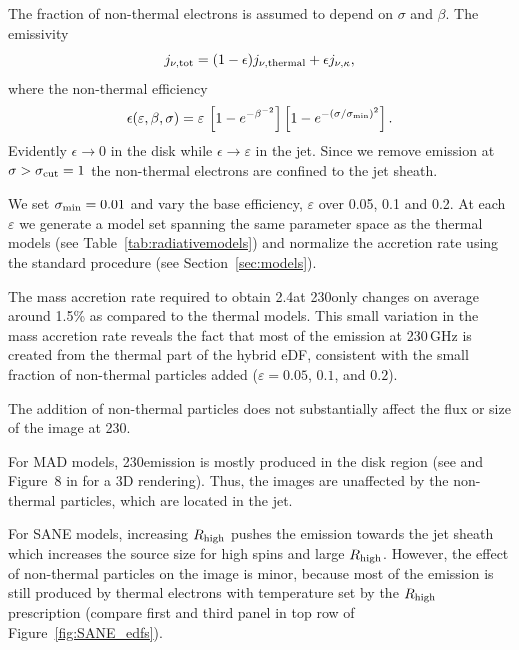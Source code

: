 The fraction of non-thermal electrons is assumed to depend on $\sigma$ and $\beta$.  The emissivity
\begin{equation}
  j_{\nu,\rm{tot}}=(1-\epsilon) j_{\nu,\rm{thermal}} + \epsilon j_{\nu, \kappa},
  \label{eq:kappaeff}
\end{equation}
where the non-thermal efficiency
\begin{equation}
  \epsilon(\varepsilon,\beta,\sigma)=\varepsilon\,
  \left[1 - e^{-\beta^{-2}}\right]
  \left[1-e^{-(\sigma/\sigma_{\rm min})^2}\right].
  \label{eq:efficiencybetasigma}
\end{equation}
Evidently $\epsilon \rightarrow 0$ in the disk while $\epsilon \rightarrow \varepsilon$ in the jet.
Since we remove emission at $\sigma > \sigma_{\rm cut} = 1$ the non-thermal electrons are confined to the jet sheath.

We set $\sigma_{\rm min}=0.01$ and vary the base efficiency, $\varepsilon$ over 0.05, 0.1 and 0.2.
At each $\varepsilon$ we generate a model set spanning the same parameter space as the thermal models (see Table~\ref{tab:radiativemodels}) and normalize the accretion rate using the standard procedure (see Section~\ref{sec:models}).

The mass accretion rate required to obtain 2.4\Jy at 230\GHz only changes on average around 1.5\% as compared to the thermal models.
This small variation in the mass accretion rate reveals the fact that most of the emission at 230\,GHz is created from the thermal part of the hybrid eDF, consistent with the small fraction of non-thermal particles added ($\varepsilon=0.05$, $0.1$, and $0.2$).

\label{varkappa230}

The addition of non-thermal particles does not substantially affect the flux or size of the image at 230\GHz.

For MAD models, 230\GHz emission is mostly produced in the disk region (see  and Figure~8 in \citealt{Wong_2022} for a 3D rendering).
Thus, the images are unaffected by the non-thermal particles, which are located in the jet.

For SANE models, increasing $R_\mathrm{high}$ pushes the emission towards the jet sheath which increases the source size for high spins and large $R_\mathrm{high}$.
However, the effect of non-thermal particles on the image is minor, because most of the emission is still produced by thermal electrons with temperature set by the $R_\mathrm{high}$ prescription (compare first and third panel in top row of Figure~\ref{fig:SANE_edfs}).

